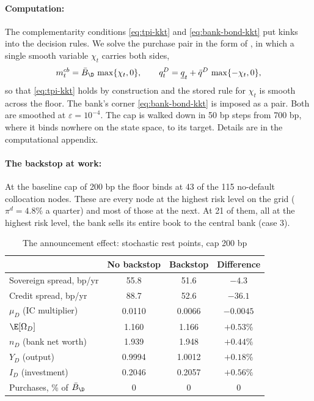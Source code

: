 \paragraph{Computation:}
The complementarity conditions \eqref{eq:tpi-kkt} and \eqref{eq:bank-bond-kkt}
put kinks into the decision rules. We solve the purchase pair in the form of
\cite{garcia1981pathways}, in which a single smooth variable $\chi_t$ carries both
sides,
\begin{equation}
m^{cb}_t=\bar B_\D\,\max\{\chi_t,0\},
\qquad
q^{D}_t=\underline q_t+\bar q^{D}\,\max\{-\chi_t,0\},
\label{eq:gz}
\end{equation}
so that \eqref{eq:tpi-kkt} holds by construction and the stored rule for
$\chi_t$ is smooth across the floor. The bank's corner \eqref{eq:bank-bond-kkt} is
imposed as a \cite{fischer1992special} pair. Both are smoothed at
$\varepsilon=10^{-4}$. The cap is walked down in 50 bp steps from 700 bp, where
it binds nowhere on the state space, to its target. Details are in the
computational appendix.



\paragraph{The backstop at work:}
At the baseline cap of 200 bp the floor binds at 43 of the 115 no-default
collocation nodes. These are every node at the highest risk level on the grid
($\pi^{d}=4.8\%$ a quarter) and most of those at the next. At 21 of them, all at
the highest risk level, the bank sells its entire book to the central bank (case
3).

\begin{table}[ht]
\centering
\caption{The announcement effect: stochastic rest points, cap 200 bp}
\label{tab:tpi-rest}
\begin{tabular}{lccc}
\hline
 & No backstop & Backstop & Difference\\
\hline
Sovereign spread, bp/yr          & 55.8   & 51.6   & $-4.3$\\
Credit spread, bp/yr             & 88.7   & 52.6   & $-36.1$\\
$\mu_D$ (IC multiplier)          & 0.0110 & 0.0066 & $-0.0045$\\
$\E[\Omega_D]$                   & 1.160  & 1.166  & $+0.53\%$\\
$n_D$ (bank net worth)           & 1.939  & 1.948  & $+0.44\%$\\
$Y_D$ (output)                   & 0.9994 & 1.0012 & $+0.18\%$\\
$I_D$ (investment)               & 0.2046 & 0.2057 & $+0.56\%$\\
Purchases, \% of $\bar B_\D$     & 0      & 0      & 0\\
\hline
\end{tabular}
\end{table}

